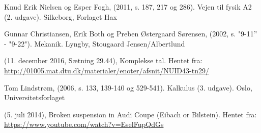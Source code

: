 \begin{thebibliography}{9}


 
  Knud Erik Nielsen og Esper Fogh,
  (2011, s. 187, 217 og 286). 
  Vejen til fysik A2 (2. udgave). 
  Silkeborg,
  Forlaget Hax

  Gunnar Christiansen, Erik Both og Preben Østergaard Sørensen,
  (2002, s. "9-11'' - "9-22"). 
  Mekanik. 
  Lyngby,
  Stougaard Jensen/Albertlund
  
(11. december 2016, Sætning 29.44), Komplekse tal. Hentet fra:
\url{http://01005.mat.dtu.dk/materialer/enoter/afsnit/NUID43-tn29/}

  Tom Lindstrøm,
  (2006, s. 133, 139-140 og 529-541). 
  Kalkulus (3. udgave). 
  Oslo,
  Universitetsforlaget
 
 (5. juli 2014), Broken suspension in Audi Coupe (Eibach or Bilstein). Hentet fra:
 \url{https://www.youtube.com/watch?v=EselFupQdGs}
  
\end{thebibliography}